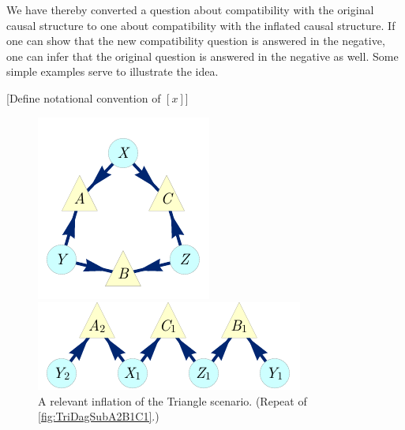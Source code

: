 We have thereby converted a question about compatibility with the original causal structure to one about compatibility with the inflated causal structure.  If one can show that the new compatibility question is answered in the negative, one can infer that the original question is answered in the negative as well.    Some simple examples serve to illustrate the idea. 




\color{purple}
[Define notational convention of $[x]$]
\color{black}

\par\smallskip\nobreak
\begin{figure}[bh]
\centering
\begin{minipage}[t]{0.45\linewidth}
\centering
\includegraphics[scale=1]{TriDagRaw.pdf}
\caption{The causal structure of the Triangle scenario. (Repeat of \cref{fig:TriMainDAG}.)}\label{fig:TriMainDAGv2}
\end{minipage}
\hfill
\begin{minipage}[t]{0.45\linewidth}
\centering
\includegraphics[scale=1]{TriDagSubA2B1C1.pdf}
\caption{A relevant inflation of the Triangle scenario. (Repeat of \cref{fig:TriDagSubA2B1C1}.)}\label{fig:TriDagSubA2B1C1v2}
\end{minipage}
\end{figure}


